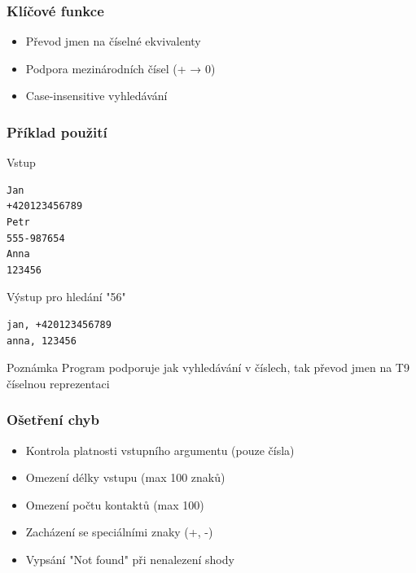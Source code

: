 \documentclass{beamer}
\begin{document}
\begin{frame}[fragile]
\frametitle{Klíčové funkce}
\begin{itemize}
\item Převod jmen na číselné ekvivalenty
\item Podpora mezinárodních čísel (+ → 0)
\item Case-insensitive vyhledávání
\end{itemize}
\begin{algorithm}[H]
\caption{Algoritmus pro hledání podřetězce}\label{alg:one}
\end{algorithm}
\end{frame}

\begin{frame}[fragile]
\frametitle{Příklad použití}
\begin{exampleblock}{Vstup}
\begin{lstlisting}[basicstyle=\ttfamily\small]
Jan
+420123456789
Petr
555-987654
Anna
123456
\end{lstlisting}
\end{exampleblock}

\begin{block}{Výstup pro hledání "56"}
\begin{lstlisting}[basicstyle=\ttfamily\small]
jan, +420123456789
anna, 123456
\end{lstlisting}
\end{block}

\begin{alertblock}{Poznámka}
Program podporuje jak vyhledávání v číslech, tak převod jmen na T9 číselnou reprezentaci
\end{alertblock}
\end{frame}

\begin{frame}
\frametitle{Ošetření chyb}
\begin{itemize}
\item Kontrola platnosti vstupního argumentu (pouze čísla)
\item Omezení délky vstupu (max 100 znaků)
\item Omezení počtu kontaktů (max 100)
\item Zacházení se speciálními znaky (+, -)
\item Vypsání "Not found" při nenalezení shody
\end{itemize}
\end{frame}
\end{document}
